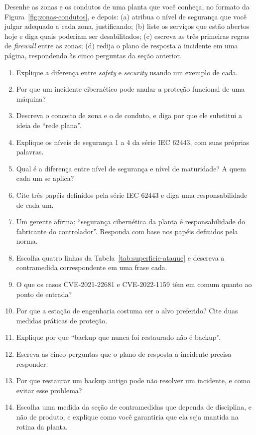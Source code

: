 \begin{pratica}
Desenhe as zonas e os condutos de uma planta que você conheça, no formato da
Figura~\ref{fig:zonas-condutos}, e depois:
(a) atribua o nível de segurança que você julgar adequado a cada zona, justificando;
(b) liste os serviços que estão abertos hoje e diga quais poderiam ser desabilitados;
(c) escreva as três primeiras regras de \emph{firewall} entre as zonas;
(d) redija o plano de resposta a incidente em uma página, respondendo às cinco perguntas da seção
anterior.
\end{pratica}

\begin{exercicios}
\begin{enumerate}[label=\alph*)]
  \item Explique a diferença entre \emph{safety} e \emph{security} usando um exemplo de cada.
  \item Por que um incidente cibernético pode anular a proteção funcional de uma máquina?
  \item Descreva o conceito de zona e o de conduto, e diga por que ele substitui a ideia de ``rede
        plana''.
  \item Explique os níveis de segurança 1 a 4 da série IEC 62443, com suas próprias palavras.
  \item Qual é a diferença entre nível de segurança e nível de maturidade? A quem cada um se aplica?
  \item Cite três papéis definidos pela série IEC 62443 e diga uma responsabilidade de cada um.
  \item Um gerente afirma: ``segurança cibernética da planta é responsabilidade do fabricante do
        controlador''. Responda com base nos papéis definidos pela norma.
  \item Escolha quatro linhas da Tabela~\ref{tab:superficie-ataque} e descreva a contramedida
        correspondente em uma frase cada.
  \item O que os casos CVE-2021-22681 e CVE-2022-1159 têm em comum quanto ao ponto de entrada?
  \item Por que a estação de engenharia costuma ser o alvo preferido? Cite duas medidas práticas de
        proteção.
  \item Explique por que ``backup que nunca foi restaurado não é backup''.
  \item Escreva as cinco perguntas que o plano de resposta a incidente precisa responder.
  \item Por que restaurar um backup antigo pode não resolver um incidente, e como evitar esse
        problema?
  \item Escolha uma medida da seção de contramedidas que dependa de disciplina, e não de produto, e
        explique como você garantiria que ela seja mantida na rotina da planta.
\end{enumerate}
\end{exercicios}
